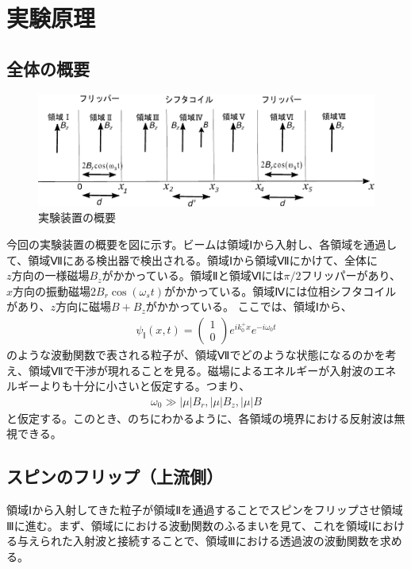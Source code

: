 \section{実験原理}\label{pi2flipper_sec}
\subsection{全体の概要}
\begin{figure}[h]
\begin{center}
\includegraphics[width=13cm]{pi2flipper/zenntaizu.pdf}
\caption{実験装置の概要}
\end{center}
\end{figure}
今回の実験装置の概要を図に示す。ビームは領域Ⅰから入射し、各領域を通過して、領域Ⅶにある検出器で検出される。領域Ⅰから領域Ⅶにかけて、全体に$z方向の一様磁場B_{z}$がかかっている。領域Ⅱと領域Ⅵには$\pi/2フリッパー$があり、$x方向の振動磁場2B_{r}\cos(\omega_{s}t)$がかかっている。領域Ⅳには位相シフタコイルがあり、$z方向に磁場B+B_{z}$がかかっている。
ここでは、領域Ⅰから、
\begin{align}
{\psi}_{Ⅰ}(x,t)=
\begin{pmatrix}
1 \\
0
\end{pmatrix}
e^{ik_{0}^{+}x}e^{-i\omega_{0}t}
\end{align}
のような波動関数で表される粒子が、領域Ⅶでどのような状態になるのかを考え、領域Ⅶで干渉が現れることを見る。磁場によるエネルギーが入射波のエネルギーよりも十分に小さいと仮定する。つまり、
\begin{align}
\omega_{0} \gg |{\mu}|B_{r},  |{\mu}|B_{z},  |{\mu}|B
\end{align}
と仮定する。このとき、のちにわかるように、各領域の境界における反射波は無視できる。
\subsection{スピンのフリップ（上流側）}
領域Ⅰから入射してきた粒子が領域Ⅱを通過することでスピンをフリップさせ領域Ⅲに進む。まず、領域ににおける波動関数のふるまいを見て、これを領域Ⅰにおける与えられた入射波と接続することで、領域Ⅲにおける透過波の波動関数を求める。
